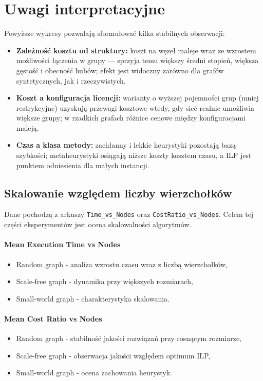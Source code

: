 \section{Uwagi interpretacyjne}
Powyższe wykresy pozwalają sformułować kilka stabilnych obserwacji:
\begin{itemize}
  \item \textbf{Zależność kosztu od struktury:} koszt na węzeł maleje wraz ze wzrostem możliwości łączenia w grupy — sprzyja temu większy średni stopień, większa gęstość i obecność hubów; efekt jest widoczny zarówno dla grafów syntetycznych, jak i rzeczywistych.
  \item \textbf{Koszt a konfiguracja licencji:} warianty o wyższej pojemności grup (mniej restrykcyjne) uzyskują przewagi kosztowe wtedy, gdy sieć realnie umożliwia większe grupy; w rzadkich grafach różnice cenowe między konfiguracjami maleją.
  \item \textbf{Czas a klasa metody:} zachłanny i lekkie heurystyki pozostają bazą szybkości; metaheurystyki osiągają niższe koszty kosztem czasu, a ILP jest punktem odniesienia dla małych instancji.
\end{itemize}

\subsection{Skalowanie względem liczby wierzchołków}

Dane pochodzą z arkuszy \texttt{Time\_vs\_Nodes} oraz \texttt{CostRatio\_vs\_Nodes}.
Celem tej części eksperymentów jest ocena skalowalności algorytmów.

\paragraph{Mean Execution Time vs Nodes}
\begin{itemize}
    \item Random graph - analiza wzrostu czasu wraz z liczbą wierzchołków,
    \item Scale-free graph - dynamika przy większych rozmiarach,
    \item Small-world graph - charakterystyka skalowania.
\end{itemize}

\paragraph{Mean Cost Ratio vs Nodes}
\begin{itemize}
    \item Random graph - stabilność jakości rozwiązań przy rosnącym rozmiarze,
    \item Scale-free graph - obserwacja jakości względem optimum ILP,
    \item Small-world graph - ocena zachowania heurystyk.
\end{itemize}

